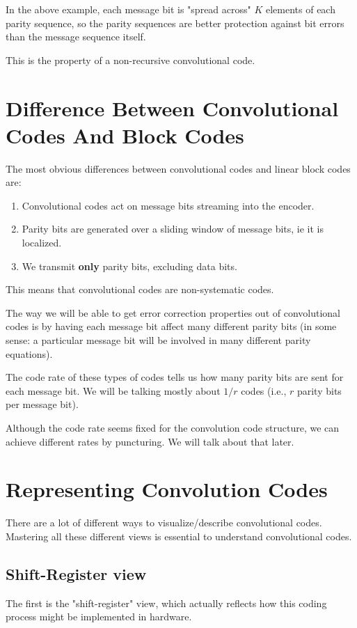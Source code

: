 In the above example, each message bit is "spread across" \(K\) elements of each parity
sequence, so the parity sequences are better protection against bit errors than the message sequence itself.

This is the property of a non-recursive convolutional code. 


\section{Difference Between Convolutional Codes And Block Codes}
The most obvious differences between convolutional codes and linear
block codes are:
\begin{enumerate}
    \item Convolutional codes act on message bits streaming into the encoder. 
    \item Parity bits are generated over a sliding window of message bits, ie it is localized.
    \item We transmit \textbf{only} parity bits, excluding data bits.
\end{enumerate}
   
This means that convolutional codes are non-systematic codes.

The way we will be able to get error correction properties out of convolutional codes is by having each message bit affect many different parity bits (in some sense: a particular message bit will be involved in many different parity equations).

The code rate of these types of codes tells us how many parity bits are sent for each message bit.  We will be talking mostly about \(1/r\) codes (i.e., \(r\) parity bits per message bit). 

Although the code rate seems fixed for the convolution code structure, we can achieve different rates by puncturing. We will talk about that later. 

\section{Representing Convolution Codes}
There are a lot of different ways to visualize/describe convolutional codes. Mastering all these different views is essential to understand convolutional codes. 

\subsection{Shift-Register view}
  The first is the "shift-register" view, which actually
reflects how this coding process might be implemented in hardware.

